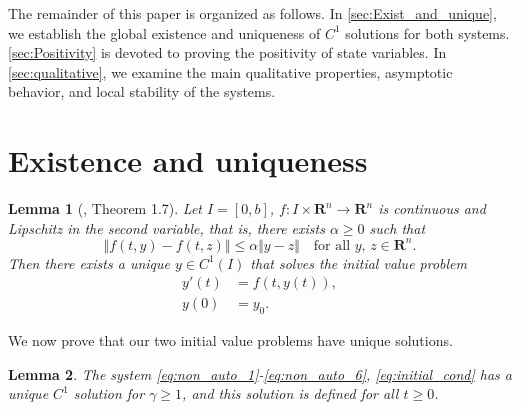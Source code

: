 \documentclass[pdflatex,sn-mathphys-num]{sn-jnl}
\theoremstyle{thmstyleone}
\newtheorem{lemma}{Lemma}[section]
\theoremstyle{thmstyletwo}
\theoremstyle{thmstylethree}
\begin{document}
The remainder of this paper is organized as follows. In \autoref{sec:Exist_and_unique}, 
we establish the 
global existence and uniqueness of $C^1$ solutions for both systems. \autoref{sec:Positivity} is devoted 
to proving the 
positivity of state variables. 
In \autoref{sec:qualitative}, we examine the main qualitative properties, asymptotic behavior, 
and local stability of the systems.

\section{Existence and uniqueness}\label{sec:Exist_and_unique}
\begin{lemma}[\cite{Agarwal2001FixedPoint}, Theorem 1.7]\label{lem:Agarwal}
Let $I=[0,b]$, $f:I\times\mathbf{R}^n\to\mathbf{R}^n$ is continuous and 
Lipschitz in the second variable, that is, there exists $\alpha\geq 0$ such that 
\begin{equation}
\Vert f(t,y)-f(t,z)\Vert\leq \alpha \Vert y-z\Vert\quad\text{for all }y,\,z
\in\mathbf{R}^n. 
\end{equation}
Then there exists a unique $y\in C^1(I)$ that solves the initial value problem
\begin{align*}
y'(t) &= f(t,y(t)),\\
y(0) &=y_0.
\end{align*}
\end{lemma}
We now prove that our two initial value problems have unique solutions.
\begin{lemma}
    The system \eqref{eq:non_auto_1}-\eqref{eq:non_auto_6}, \eqref{eq:initial_cond}  
     has a unique $C^1$ solution for $\gamma\geq 1$, and this solution is defined for all $t\geq 0$. 
\end{lemma}
\end{document}
